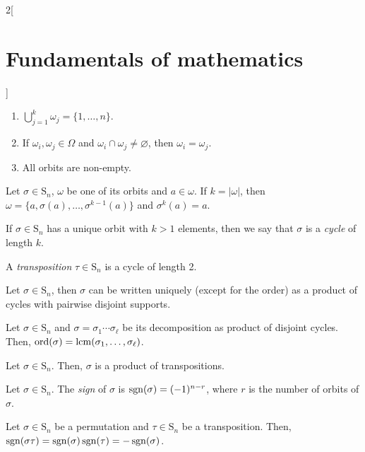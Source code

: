 \documentclass[../../../main_math.tex]{subfiles}
\begin{document}
\begin{multicols}{2}[\section{Fundamentals of mathematics}]
\begin{theorem}
    \begin{enumerate}
      \item $\bigcup_{j=1}^k \omega_j=\{1,\ldots,n\}$.
      \item If $\omega_i,\omega_j\in\Omega$ and $\omega_i\cap\omega_j\ne\varnothing$, then $\omega_i=\omega_j$.
      \item All orbits are non-empty.
    \end{enumerate}
  \end{theorem}
  \begin{theorem}
    Let $\sigma\in \text{S}_n$, $\omega$ be one of its orbits and $a\in\omega$. If $k=|\omega|$, then $\omega=\{a,\sigma(a),\ldots,\sigma^{k-1}(a)\}$ and $\sigma^k(a)=a$.
  \end{theorem}
  \begin{definition}
    If $\sigma\in \text{S}_n$ has a unique orbit with $k>1$ elements, then we say that $\sigma$ is a \emph{cycle} of length $k$.
  \end{definition}
  \begin{definition}
    A \emph{transposition} $\tau\in \text{S}_n$ is a cycle of length 2.
  \end{definition}
  \begin{theorem}
    Let $\sigma\in \text{S}_n$, then $\sigma$ can be written uniquely (except for the order) as a product of cycles with pairwise disjoint supports.
  \end{theorem}
  \begin{corollary}
    Let $\sigma\in \text{S}_n$ and $\sigma=\sigma_1\cdots\sigma_\ell$ be its decomposition as product of disjoint cycles. Then, $\text{ord}(\sigma)=\operatorname{lcm}(\sigma_1,\ldots,\sigma_\ell)$.
  \end{corollary}
  \begin{corollary}
    Let $\sigma\in \text{S}_n$. Then, $\sigma$ is a product of transpositions.
  \end{corollary}
  \begin{definition}
    Let $\sigma\in \text{S}_n$. The \emph{sign} of $\sigma$ is $\operatorname{sgn}(\sigma)=(-1)^{n-r}$, where $r$ is the number of orbits of $\sigma$.
  \end{definition}
  \begin{theorem}
    Let $\sigma\in \text{S}_n$ be a permutation and $\tau\in \text{S}_n$ be a transposition. Then, $\operatorname{sgn}(\sigma\tau)=\operatorname{sgn}(\sigma)\operatorname{sgn}(\tau)=-\operatorname{sgn}(\sigma)$.
  \end{theorem}
  \begin{corollary}

\end{corollary}
\end{multicols}
\end{document}
